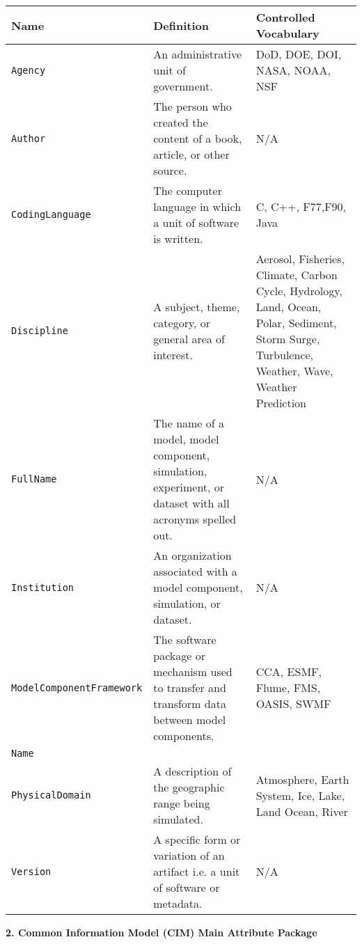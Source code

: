 \begin{tabular}{|p{8cm}|p{20cm}|p{10cm}}
     \hline\hline
     {\bf Name} & {\bf Definition} & {\bf Controlled Vocabulary}\\
     \hline\hline
     {\tt Agency} & An administrative unit of government.& DoD, DOE, DOI, NASA, NOAA, NSF\\
     {\tt Author} & The person who created the content of a book, article, or other source. & N/A\\
     {\tt CodingLanguage} & The computer language in which a unit of software is written. & C, C++, F77,F90, Java\\
     {\tt Discipline} & A subject, theme, category, or general area of interest.& Aerosol, Fisheries, Climate, Carbon Cycle, Hydrology, Land, Ocean, Polar, Sediment, Storm Surge, Turbulence, Weather, Wave, Weather Prediction \\
     {\tt FullName} & The name of a model, model component, simulation, experiment, or dataset with all acronyms spelled out.& N/A\\
     {\tt Institution} & An organization associated with a model component, simulation, or dataset.& N/A\\
     {\tt ModelComponentFramework} & The software package or mechanism used to transfer and transform data between model components.& CCA, ESMF, Flume, FMS, OASIS, SWMF \\
     {\tt Name} & \\
     {\tt PhysicalDomain} & A description of the geographic range being simulated. & Atmosphere, Earth System, Ice, Lake, Land Ocean, River\\
     {\tt Version} & A specific form or variation of an artifact i.e. a unit of software or metadata. & N/A\\ 
\end{tabular}



\vspace{.20in}


{\bf 2. Common Information Model (CIM) Main Attribute Package}

